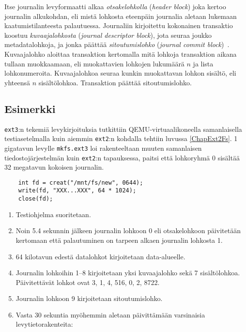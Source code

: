 Itse journalin levyformaatti alkaa \emph{otsakelohkolla} (\emph{header block}) joka kertoo journalin alkukohdan,
eli mistä lohkosta eteenpäin journalia aletaan lukemaan kaatumistilanteesta palautuessa.
Journaliin kirjoitettu kokonainen transaktio koostuu \emph{kuvaajalohkosta} (\emph{journal descriptor block}),
jota seuraa joukko metadatalohkoja,
ja jonka päättää \emph{sitoutumislohko} (\emph{journal commit block})~\cite{JournalingAnalysis}.
Kuvaajalohko aloittaa transaktion kertomalla mitä lohkoja transaktion aikana tullaan muokkaamaan,
eli muokattavien lohkojen lukumäärä $n$ ja lista lohkonumeroita.
Kuvaajalohkoa seuraa kunkin muokattavan lohkon sisältö, eli yhteensä $n$ sisältölohkoa.
Transaktion päättää sitoutumislohko.

\subsection{Esimerkki}
\texttt{ext3}:n tekemiä levykirjoituksia tutkittiin QEMU-virtuaalikoneella samanlaisella testiasetelmalla kuin aiemmin \texttt{ext2}:n kohdalla tehtiin luvussa \ref{ChapExt2Fs}.
1 gigatavun levylle \texttt{mkfs.ext3} loi rakenteeltaan muuten samanlaisen tiedostojärjestelmän kuin \texttt{ext2}:n tapauksessa,
paitsi että lohkoryhmä 0 sisältää 32 megatavun kokoisen journalin.

\begin{verbatim}
    int fd = creat("/mnt/fs/new", 0644);
    write(fd, "XXX...XXX", 64 * 1024);
    close(fd);
\end{verbatim}

\begin{enumerate}
    \item{Testiohjelma suoritetaan.}
    \item{Noin 5.4 sekunnin jälkeen journalin lohkoon 0 eli otsakelohkoon päivitetään kertomaan että palautuminen on tarpeen alkaen journalin lohkosta 1.}
    \item{64 kilotavun edestä datalohkot kirjoitetaan data-alueelle.}
    \item{Journalin lohkoihin 1--8 kirjoitetaan yksi kuvaajalohko sekä 7 sisältölohkoa. Päivitettävät lohkot ovat 3, 1, 4, 516, 0, 2, 8722.}
    \item{Journalin lohkoon 9 kirjoitetaan sitoutumislohko.}
    \item{Vasta 30 sekuntia myöhemmin aletaan päivittämään varsinaisia levytietorakenteita:}
\end{enumerate}

